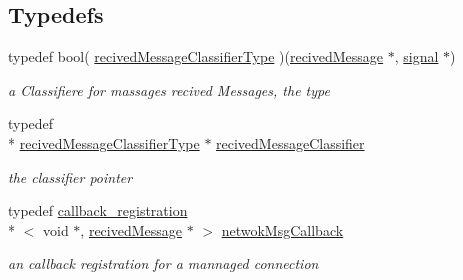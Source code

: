 \subsection*{Typedefs}
\begin{DoxyCompactItemize}
\item 
typedef bool( \hyperlink{namespacellu_1_1network_a62e69230f04d1998f17b11e3bcc2d121}{recived\+Message\+Classifier\+Type} )(\hyperlink{structllu_1_1network_1_1recived_message}{recived\+Message} $\ast$, \hyperlink{namespacellu_1_1callback_a082ed24306809c4d250bd5ddfbae177f}{signal} $\ast$)
\begin{DoxyCompactList}\small\item\em a Classifiere for massages recived Messages, the type \end{DoxyCompactList}\item 
typedef \\*
\hyperlink{namespacellu_1_1network_a62e69230f04d1998f17b11e3bcc2d121}{recived\+Message\+Classifier\+Type} $\ast$ \hyperlink{namespacellu_1_1network_ac629c1180a0bee8ddef541f73cb3e5f9}{recived\+Message\+Classifier}
\begin{DoxyCompactList}\small\item\em the classifier pointer \end{DoxyCompactList}\item 
typedef \hyperlink{classllu_1_1callback_1_1callback__registration}{callback\+\_\+registration}\\*
$<$ void $\ast$, \hyperlink{structllu_1_1network_1_1recived_message}{recived\+Message} $\ast$ $>$ \hyperlink{namespacellu_1_1network_a999d34263abe84a87d12271383c606b9}{netwok\+Msg\+Callback}
\begin{DoxyCompactList}\small\item\em an callback registration for a mannaged connection \end{DoxyCompactList}\end{DoxyCompactItemize}
